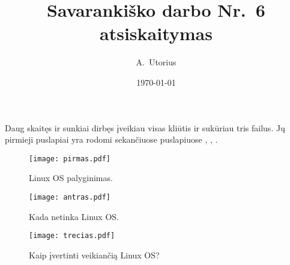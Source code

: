 \documentclass{article}
\begin{document}
\author{A.\ Utorius}
\title{Savarankiško darbo Nr.\ 6 atsiskaitymas}
\date{\today}

\maketitle

Daug skaitęs ir sunkiai dirbęs įveikiau visas kliūtis ir sukūriau tris
failus. Jų pirmieji puslapiai yra rodomi sekančiuose puslapiuose
\pageref{fig-linuxOSyes}, \pageref{fig-linuxOSno},
\pageref{fig-testCriteria}.

\clearpage

\begin{figure}[p]
\centering
\texttt{[image: pirmas.pdf]}
\caption{Linux OS palyginimas.}
\label{fig-linuxOSyes}
\end{figure}

\clearpage

\begin{figure}[p]
\centering
\texttt{[image: antras.pdf]}
\caption{Kada netinka Linux OS.}
\label{fig-linuxOSno}
\end{figure}
\clearpage

\begin{figure}[p]
\centering
\texttt{[image: trecias.pdf]}
\caption{Kaip įvertinti veikiančią Linux OS?}
\label{fig-testCriteria}
\end{figure}
\end{document}
